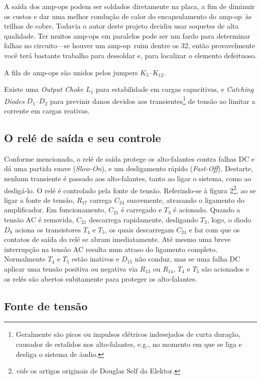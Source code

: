 \documentclass[12pt, a4paper, leqno, twoside]{book}
\def\ampop{amp-op}
\begin{document}
  A sa\'ida dos \ampop{s} podem ser soldados diretamente na placa, a fim de diminuir os custos e dar uma melhor condu\c c\~ao de calor do encapsulamento do \ampop\ \`as trilhas de cobre. Todavia o autor deste projeto decidiu usar soquetes de alta qualidade. Ter muitos \ampop{s} em paralelos pode ser um fardo para determinar falhas no circuito---se houver um \ampop\ ruim dentre os 32, ent\~ao provavelmente voc\^e ter\'a bastante trabalho para dessoldar e, para localizar o elemento defeituoso. 

  A fila de \ampop{s} s\~ao unidos pelos jumpers $K_5$--$K_{12}$.

  Existe uma {\it Output Choke} $L_1$ para estabilidade em cargas capacitivas, e {\it Catching Diodes} $D_1$--$D_2$ para previnir danos devidos aos transientes\footnote{Geralmente s\~ao picos ou impulsos el\'etricos indesejados de curta dura\c c\~ao, causador de estalidos nos alto-falantes, e.g., no momento em que se liga e desliga o sistema de \'audio.} de tens\~ao ao limitar a corrente em cargas reativas. 

  \subsection{O rel\'e de sa\'ida e seu controle}

  Conforme mencionado, o rel\'e de sa\'ida protege os alto-falantes contra falhas DC e d\'a uma partida suave ({\it Slow-On}\/), e um desligamento r\'apido ({\it Fast-Off}\/). Destarte, nenhum transiente \'e passado aos alto-falantes, tanto ao ligar o sistema, como ao deslig\'a-lo. O rel\'e \'e controlado pela fonte de tens\~ao. Referindo-se \`a figura 2\footnote{{\it vide} os artigos originais de Douglas Self da Elektor.}, ao se ligar a fonte de tens\~ao, $R_{17}$ carrega $C_{24}$ suavemente, atrasando o ligamento do amplificador. Em funcionamento, $C_{21}$ \'e carregado e $T_3$ \'e acionado. Quando a tens\~ao AC \'e removida, $C_{21}$ descarrega rapidamente, desligando $T_3$, logo, o diodo $D_8$ aciona os transistores $T_4$ e $T_5$, os quais descarregam $C_{24}$ e faz com que os contatos de sa\'ida do rel\'e se abram imediatamente. At\'e mesmo uma breve interrup\c c\~ao na tens\~ao AC resulta num atraso do ligamento completo. Normalmente $T_4$ e $T_5$ est\~ao inativos e $D_{15}$ n\~ao conduz, mas se uma falha DC aplicar uma tens\~ao positiva ou negativa via $R_{13}$ ou $R_{14}$, $T_4$ e $T_5$ s\~ao acionados e os rel\'es s\~ao abertos subitamente para proteger os alto-falantes.

  \subsection{Fonte de tens\~ao}
\end{document}
